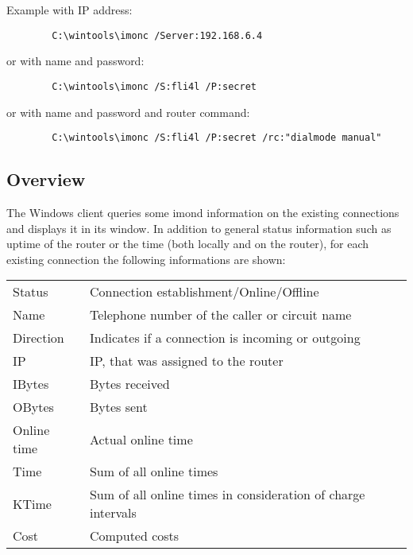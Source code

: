   Example with IP address:

\begin{example}
\begin{verbatim}
        C:\wintools\imonc /Server:192.168.6.4
\end{verbatim}
\end{example}

  or with name and password:

\begin{example}
\begin{verbatim}
        C:\wintools\imonc /S:fli4l /P:secret
\end{verbatim}
\end{example}

  or with name and password and router command:

\begin{example}
\begin{verbatim}
        C:\wintools\imonc /S:fli4l /P:secret /rc:"dialmode manual"
\end{verbatim}
\end{example}

  \subsection{Overview}

  The Windows client queries some imond information on the existing
  connections and displays it in its window. In addition to general
  status information such as uptime of the router or the time (both locally
  and on the router), for each existing connection the following informations
  are shown:

  \begin{tabular}{lp{9cm}}
    Status             &Connection establishment/Online/Offline\\
    Name               &Telephone number of the caller or circuit name\\
    Direction          &Indicates if a connection is incoming or outgoing\\
    IP                 &IP, that was assigned to the router\\
    IBytes             &Bytes received\\
    OBytes             &Bytes sent\\
    Online time        &Actual online time\\
    Time               &Sum of all online times\\
    KTime              &Sum of all online times in consideration of charge intervals\\
    Cost               &Computed costs\\
  \end{tabular}

